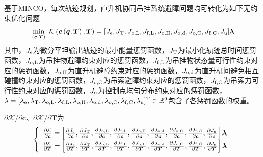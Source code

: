 基于MINCO，每次轨迹规划，直升机协同吊挂系统避障问题均可转化为如下无约束优化问题
\begin{equation}{\label{Equation:minco_optimization}}
    \min\limits_{(\boldsymbol{c},\boldsymbol{T})} \,\, \mathcal{K} \left(\boldsymbol{c}\left(\boldsymbol{q}, \boldsymbol{T}\right),\boldsymbol{T}\right) = [J_{\rm{e}}, J_{\rm{T}}, J_{\rm{o,L}}, J_{\rm{f,L}}, J_{\rm{o,H}}, J_{\rm{o,d}}, J_{\rm{o,C}}, J_{\rm{f,C}}, J_{\rm{u}}] \boldsymbol{\lambda}  
\end{equation}
其中，$J_{\rm{e}}$为微分平坦输出轨迹的最小能量惩罚函数，$J_{\rm{T}}$为最小化轨迹总时间惩罚函数，$J_{\rm{o,L}}$为吊挂物避障约束对应的惩罚函数，$J_{\rm{f,L}}$为吊挂物状态量可行性约束对应的惩罚函数，$J_{\rm{o,H}}$为直升机避障约束对应的惩罚函数，$J_{\rm{o,d}}$为直升机间避免相互碰撞约束对应的惩罚函数，$J_{\rm{o,C}}$为吊索避障约束对应的惩罚函数，$J_{\rm{f,C}}$为吊索力可行性约束对应的惩罚函数，$J_{\rm{u}}$为控制点均匀分布约束对应的惩罚函数，$\lambda = [\lambda_{\rm{e}}, \lambda_{\rm{T}}, \lambda_{\rm{o,L}}, \lambda_{\rm{f,L}}, \lambda_{\rm{o,H}}, \lambda_{\rm{o,d}}, \lambda_{\rm{o,C}}, \lambda_{\rm{f,C}}, \lambda_{\rm{u}}]^{\rm{T}} \in \mathbb{R}^9 $包含了各惩罚函数的权重。

$\partial\mathcal{K}/{\partial\boldsymbol{c}}$、${\partial\mathcal{K}}/{\partial\boldsymbol{T}}$为
\begin{equation}
    \left\{
    \begin{array}{l}
        \frac{\partial \mathcal{K}}{\partial \boldsymbol{c}} = \left[
        \frac{\partial J_{\rm{e}}}{\partial \boldsymbol{c}},
        \frac{\partial J_{\rm{T}}}{\partial \boldsymbol{c}},
        \frac{\partial J_{\rm{o,L}}}{\partial \boldsymbol{c}},
        \frac{\partial J_{\rm{f,L}}}{\partial \boldsymbol{c}},
        \frac{\partial J_{\rm{o,H}}}{\partial \boldsymbol{c}},
        \frac{\partial J_{\rm{o,d}}}{\partial \boldsymbol{c}},
        \frac{\partial J_{\rm{o,C}}}{\partial \boldsymbol{c}},
        \frac{\partial J_{\rm{f,C}}}{\partial \boldsymbol{c}},
        \frac{\partial J_{\rm{u}}}{\partial \boldsymbol{c}}
        \right]\boldsymbol{\lambda}\\
        \frac{\partial \mathcal{K}}{\partial \boldsymbol{T}} =\left[
        \frac{\partial J_{\rm{e}}}{\partial \boldsymbol{T}},
        \frac{\partial J_{\rm{T}}}{\partial \boldsymbol{T}},
        \frac{\partial J_{\rm{o,L}}}{\partial \boldsymbol{T}},
        \frac{\partial J_{\rm{f,L}}}{\partial \boldsymbol{T}},
        \frac{\partial J_{\rm{o,H}}}{\partial \boldsymbol{T}},
        \frac{\partial J_{\rm{o,d}}}{\partial \boldsymbol{T}},
        \frac{\partial J_{\rm{o,C}}}{\partial \boldsymbol{T}},
        \frac{\partial J_{\rm{f,C}}}{\partial \boldsymbol{T}},
        \frac{\partial J_{\rm{u}}}{\partial \boldsymbol{T}}
        \right]\boldsymbol{\lambda}
    \end{array}
    \right.
\end{equation}



